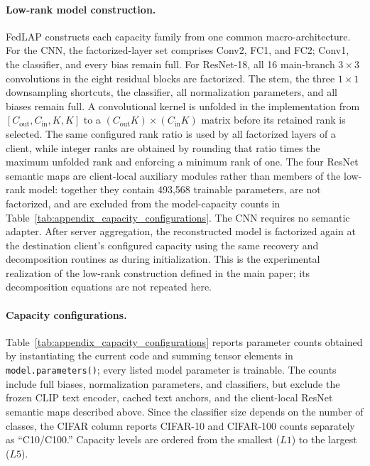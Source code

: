 \paragraph{Low-rank model construction.}
FedLAP constructs each capacity family from one common macro-architecture.
For the CNN, the factorized-layer set comprises Conv2, FC1, and FC2; Conv1,
the classifier, and every bias remain full.  For ResNet-18, all 16
main-branch $3\times3$ convolutions in the eight residual blocks are
factorized.  The stem, the three $1\times1$ downsampling shortcuts, the
classifier, all normalization parameters, and all biases remain full.  A
convolutional kernel is unfolded in the implementation from
$[C_{\mathrm{out}},C_{\mathrm{in}},K,K]$ to a
$(C_{\mathrm{out}}K)\times(C_{\mathrm{in}}K)$ matrix before its retained rank
is selected.  The same configured rank ratio is used by all factorized layers
of a client, while integer ranks are obtained by rounding that ratio times the
maximum unfolded rank and enforcing a minimum rank of one.  The four ResNet
semantic maps are client-local auxiliary modules rather than members of the
low-rank model: together they contain 493,568 trainable parameters, are not
factorized, and are excluded from the model-capacity counts in
Table~\ref{tab:appendix_capacity_configurations}.  The CNN requires no
semantic adapter.  After server aggregation, the reconstructed model is
factorized again at the destination client's configured capacity using the
same recovery and decomposition routines as during initialization.  This is
the experimental realization of the low-rank construction defined in the
main paper; its decomposition equations are not repeated here.

\paragraph{Capacity configurations.}
Table~\ref{tab:appendix_capacity_configurations} reports parameter counts
obtained by instantiating the current code and summing tensor elements in
\texttt{model.parameters()}; every listed model parameter is trainable.  The
counts include full biases, normalization parameters, and classifiers, but
exclude the frozen CLIP text encoder, cached text anchors, and the client-local
ResNet semantic maps described above.  Since the classifier size depends on
the number of classes, the CIFAR column reports CIFAR-10 and CIFAR-100 counts
separately as ``C10/C100.''  Capacity levels are ordered from the smallest
($L1$) to the largest ($L5$).

